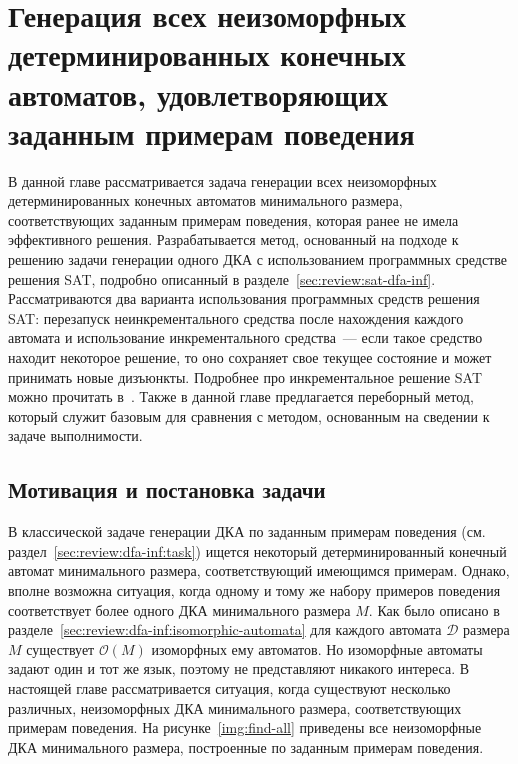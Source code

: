 
\chapter{Генерация всех неизоморфных детерминированных конечных автоматов, удовлетворяющих заданным примерам поведения} 
\label{sec:findall}

В данной главе рассматривается задача генерации всех неизоморфных детерминированных конечных автоматов минимального размера, соответствующих заданным примерам поведения, которая ранее не имела эффективного решения.
Разрабатывается метод, основанный на подходе к решению задачи генерации одного ДКА с использованием программных средстве решения SAT, подробно описанный в разделе~\ref{sec:review:sat-dfa-inf}.
Рассматриваются два варианта использования программных средств решения SAT: перезапуск неинкрементального средства после нахождения каждого автомата и использование инкрементального средства~{---} если такое средство находит некоторое решение, то оно сохраняет свое текущее состояние и может принимать новые дизъюнкты.
Подробнее про инкрементальное решение SAT можно прочитать в~\cite{DBLP:conf/sat/EenS03}.
Также в данной главе предлагается переборный метод, который служит базовым для сравнения с методом, основанным на сведении к задаче выполнимости.


\section{Мотивация и постановка задачи}
\label{sec:findall:problem}

В классической задаче генерации ДКА по заданным примерам поведения (см. раздел~\ref{sec:review:dfa-inf:task}) ищется некоторый детерминированный конечный автомат минимального размера, соответствующий имеющимся примерам.
Однако, вполне возможна ситуация, когда одному и тому же набору примеров поведения соответствует более одного ДКА минимального размера $M$.
Как было описано в разделе~\ref{sec:review:dfa-inf:isomorphic-automata} для каждого автомата $\mathcal{D}$ размера $M$ существует $\mathcal{O}\left(M\right)$ изоморфных ему автоматов.
Но изоморфные автоматы задают один и тот же язык, поэтому не представляют никакого интереса.
В настоящей главе рассматривается ситуация, когда существуют несколько различных, неизоморфных ДКА минимального размера, соответствующих примерам поведения.
На рисунке~\ref{img:find-all} приведены все неизоморфные ДКА минимального размера, построенные по заданным примерам поведения.

